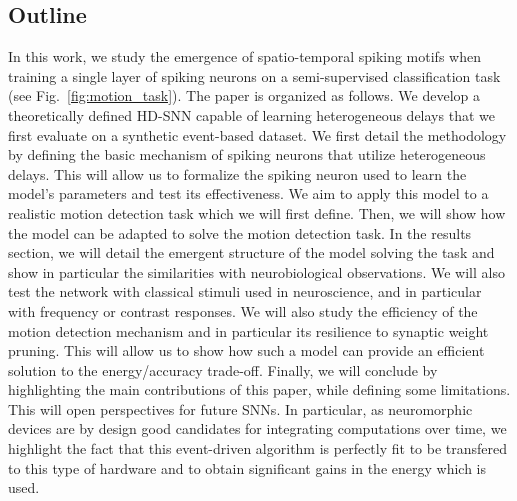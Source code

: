 \documentclass[default]{sn-jnl}%
\theoremstyle{thmstyleone}%
\theoremstyle{thmstyletwo}%
\theoremstyle{thmstylethree}%
\newcommand{\seeFig}[1]{see Fig.~\ref{fig:#1}}%
\begin{document}
\subsection{Outline}
In this work, we study the emergence of spatio-temporal spiking motifs when training a single layer of spiking neurons on a semi-supervised classification task (\seeFig{motion_task}). The paper is organized as follows. We develop a theoretically defined HD-SNN capable of learning heterogeneous delays that we first evaluate on a synthetic event-based dataset. We first detail the methodology by defining the basic mechanism of spiking neurons that utilize heterogeneous delays. This will allow us to formalize the spiking neuron used to learn the model's parameters and test its effectiveness. We aim to apply this model to a realistic motion detection task which we will first define. Then, we will show how the model can be adapted to solve the motion detection task. In the results section, we will detail the emergent structure of the model solving the task and show in particular the similarities with neurobiological observations. We will also test the network with classical stimuli used in neuroscience, and in particular with frequency or contrast responses.  We will also study the efficiency of the motion detection mechanism and in particular its resilience to synaptic weight pruning. This will allow us to show how such a model can provide an efficient solution to the energy/accuracy trade-off.  Finally, we will conclude by highlighting the main contributions of this paper, while defining some limitations. This will open perspectives for future SNNs.  In particular, as neuromorphic devices are by design good candidates for integrating computations over time, we highlight the fact that this event-driven algorithm is perfectly fit to be transfered to this type of hardware and to obtain significant gains in the energy which is used.
%
\end{document}
